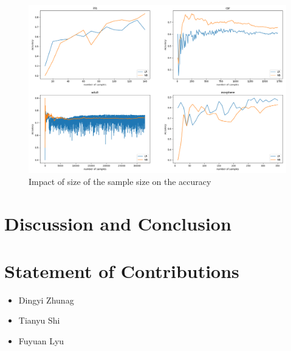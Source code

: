 \documentclass[11pt]{scrartcl}
\begin{document}
\begin{figure}[htbp]
	\centering
	\includegraphics[width=0.8\linewidth]{fig/dataset_size.png}
	\caption{Impact of size of the sample size on the accuracy}
	\label{size_accuracy}
\end{figure}


\section{Discussion and Conclusion}

\section{Statement of Contributions}

\begin{itemize}
	\item Dingyi Zhunag
	\item Tianyu Shi
	\item Fuyuan Lyu
\end{itemize}



\end{document}
